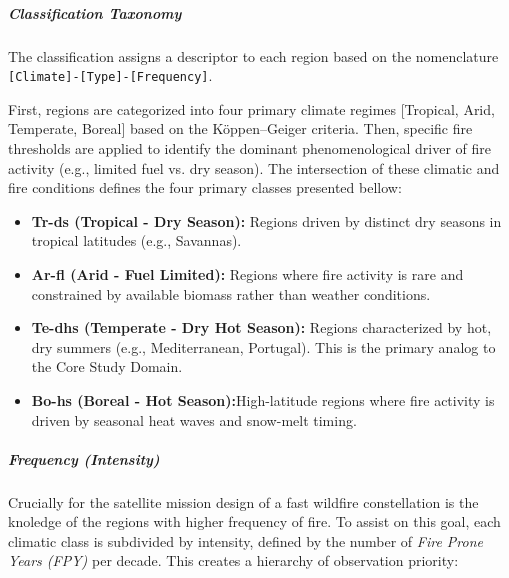 \begin{table}[ht]
{\begin{figure}[H]
    

    \label{fig:map_earths_fire_prone_region_targets}

\end{figure}



\subparagraph{Classification Taxonomy}\hspace{0pt}



The classification assigns a descriptor to each region based on the nomenclature \texttt{[Climate]-[Type]-[Frequency]}.

First, regions are categorized into four primary climate regimes [Tropical, Arid, Temperate, Boreal] based on the Köppen–Geiger criteria. Then, specific fire thresholds are applied to identify the dominant phenomenological driver of fire activity (e.g., limited fuel vs. dry season). The intersection of these climatic and fire conditions defines the four primary classes presented bellow:



\begin{itemize}

    \item \textbf{Tr-ds (Tropical - Dry Season):} Regions driven by distinct dry seasons in tropical latitudes (e.g., Savannas).

    \item \textbf{Ar-fl (Arid - Fuel Limited):} Regions where fire activity is rare and constrained by available biomass rather than weather conditions.

    \item \textbf{Te-dhs (Temperate - Dry Hot Season):} Regions characterized by hot, dry summers (e.g., Mediterranean, Portugal). This is the primary analog to the Core Study Domain.

    \item \textbf{Bo-hs (Boreal - Hot Season):}High-latitude regions where fire activity is driven by seasonal heat waves and snow-melt timing.

\end{itemize}





\subparagraph{Frequency (Intensity)} \hspace{0pt}



Crucially for the satellite mission design of a fast wildfire constellation is the knoledge of the regions with higher frequency of fire. To assist on this goal, each climatic class is subdivided by intensity, defined by the number of \textit{Fire Prone Years (FPY)} per decade. This creates a hierarchy of observation priority:



}
\end{table}
